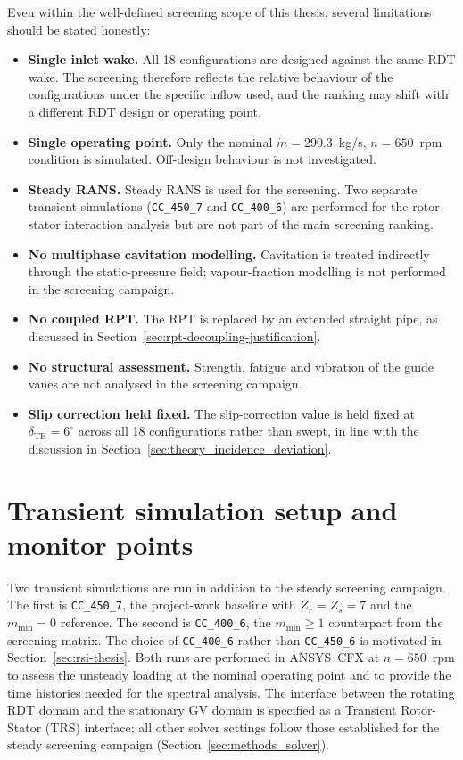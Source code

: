 Even within the well-defined screening scope of this thesis, several limitations should be stated honestly:
\begin{itemize}
  \item \textbf{Single inlet wake.} All 18 configurations are designed against the same RDT wake. The screening therefore reflects the relative behaviour of the configurations under the specific inflow used, and the ranking may shift with a different RDT design or operating point.
  \item \textbf{Single operating point.} Only the nominal $\dot m = 290.3$~kg/s, $n = 650$~rpm condition is simulated. Off-design behaviour is not investigated.
  \item \textbf{Steady RANS.} Steady RANS is used for the screening. Two separate transient simulations (\texttt{CC\_450\_7} and \texttt{CC\_400\_6}) are performed for the rotor-stator interaction analysis but are not part of the main screening ranking.
  \item \textbf{No multiphase cavitation modelling.} Cavitation is treated indirectly through the static-pressure field; vapour-fraction modelling is not performed in the screening campaign.
  \item \textbf{No coupled RPT.} The RPT is replaced by an extended straight pipe, as discussed in Section~\ref{sec:rpt-decoupling-justification}.
  \item \textbf{No structural assessment.} Strength, fatigue and vibration of the guide vanes are not analysed in the screening campaign.
  \item \textbf{Slip correction held fixed.} The slip-correction value is held fixed at $\delta_{\mathrm{TE}} = 6^\circ$ across all 18 configurations rather than swept, in line with the discussion in Section~\ref{sec:theory_incidence_deviation}.
\end{itemize}

\section{Transient simulation setup and monitor points}
\label{sec:monitor-setup}
 
Two transient simulations are run in addition to the steady screening campaign. The first is \texttt{CC\_450\_7}, the project-work baseline with $Z_r=Z_s=7$ and the $m_{\min}=0$ reference. The second is \texttt{CC\_400\_6}, the $m_{\min}\geq 1$ counterpart from the screening matrix. The choice of \texttt{CC\_400\_6} rather than \texttt{CC\_450\_6} is motivated in Section~\ref{sec:rsi-thesis}. Both runs are performed in ANSYS~CFX at $n = 650$~rpm to assess the unsteady loading at the nominal operating point and to provide the time histories needed for the spectral analysis. The interface between the rotating RDT domain and the stationary GV domain is specified as a Transient Rotor-Stator (TRS) interface; all other solver settings follow those established for the steady screening campaign (Section~\ref{sec:methods_solver}).
 
